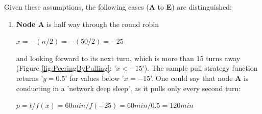 \noindent Given these assumptions, the following cases (\textbf{A} to \textbf{E}) are distinguished:
\begin{enumerate}
	\item \textbf{Node A} is half way through the round robin
	
	\begin{center}
		$x = -(n/2) = -(50/2) = -25$
	\end{center}
	
	and looking forward to its next turn, which is more than 15 turns away (Figure \ref{fig:PeeringByPulling}: '$x < -15$').
	The sample pull strategy function returns '$y = 0.5$' for values below '$x = -15$'.
	One could say that node \textbf{A} is conducting in a 'network deep sleep', as it pulls only every second turn:
	
	\begin{center}
		$p = t/f(x) = 60min/f(-25) = 60min/0.5 = 120min$
	\end{center}


\end{enumerate}
